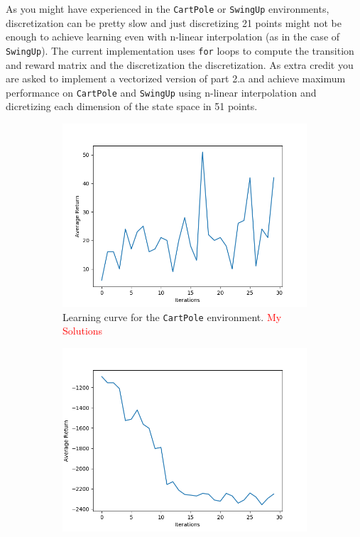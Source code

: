 \documentclass{article}
\begin{document}
\newpage
{}

As you might have experienced in the \texttt{CartPole} or \texttt{SwingUp} environments, discretization can be pretty slow and just discretizing 21 points might not be enough to achieve learning even with n-linear interpolation (as in the case of \texttt{SwingUp}). The current implementation uses \texttt{for} loops to compute the transition and reward matrix and the discretization the discretization. As extra credit you are asked to implement a vectorized version of part 2.a and achieve maximum performance on \texttt{CartPole} and \texttt{SwingUp} using n-linear interpolation and dicretizing each dimension of the state space in 51 points.

\begin{figure}[h!]
\centering
    \begin{subfigure}{0.45\textwidth}
        \centering
        \includegraphics[width=\textwidth]{figures/part_4_a.png}
          \caption{Learning curve for the \texttt{CartPole} environment. \textcolor{red}{My Solutions}}
    \end{subfigure}
    \hspace{0.2in}
    \begin{subfigure}{0.45\textwidth}
        \centering
        \includegraphics[width=\textwidth]{figures/part_4_b.png}

\end{subfigure}
\end{figure}
\end{document}
